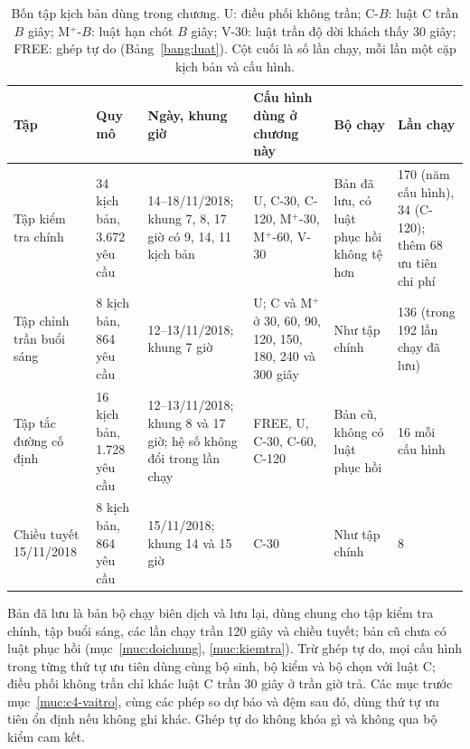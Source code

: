 \begin{table}[htbp]
\centering
\caption[Các tập kịch bản dùng trong thực nghiệm]{Bốn tập kịch bản dùng trong chương. U: điều phối không trần; C-$B$: luật C trần $B$ giây;
M$^{+}$-$B$: luật hạn chót $B$ giây; V-30: luật trần độ dời khách thấy 30 giây; FREE: ghép tự do
(Bảng~\ref{bang:luat}). Cột cuối là số lần chạy, mỗi lần một cặp kịch bản và cấu hình.}
\label{bang:c4-taptu}
\footnotesize
\setlength{\tabcolsep}{2.5pt}
\begin{tabular}{@{}p{2.5cm}p{1.9cm}p{3.1cm}p{3.0cm}p{2.6cm}p{1.9cm}@{}}
\toprule
\textbf{Tập} & \textbf{Quy mô} & \textbf{Ngày, khung giờ} & \textbf{Cấu hình dùng ở chương này} &
\textbf{Bộ chạy} & \textbf{Lần chạy}\\
\midrule
Tập kiểm tra chính & 34 kịch bản, 3.672 yêu cầu & 14--18/11/2018; khung 7, 8, 17 giờ có 9, 14, 11
kịch bản & U, C-30, C-120, M$^{+}$-30, M$^{+}$-60, V-30 & Bản đã lưu, có luật phục hồi không tệ hơn &
170 (năm cấu hình), 34 (C-120); thêm 68 ưu tiên chi phí\\
Tập chỉnh trần buổi sáng & 8 kịch bản, 864 yêu cầu & 12--13/11/2018; khung 7 giờ & U; C và M$^{+}$ ở 30, 60,
90, 120, 150, 180, 240 và 300 giây & Như tập chính & 136 (trong 192 lần chạy đã lưu)\\
Tập tắc đường cố định & 16 kịch bản, 1.728 yêu cầu & 12--13/11/2018; khung 8 và 17 giờ; hệ số không
đổi trong lần chạy & FREE, U, C-30, C-60, C-120 & Bản cũ, không có luật phục hồi & 16 mỗi cấu hình\\
Chiều tuyết 15/11/2018 & 8 kịch bản, 864 yêu cầu & 15/11/2018; khung 14 và 15 giờ & C-30 &
Như tập chính & 8\\
\bottomrule
\end{tabular}
\end{table}

Bản đã lưu là bản bộ chạy biên dịch và lưu lại, dùng chung cho tập kiểm tra chính, tập buổi sáng, các lần chạy trần
120 giây và chiều tuyết; bản cũ chưa có luật phục hồi (mục~\ref{muc:doichung}, \ref{muc:kiemtra}). Trừ ghép tự do, mọi
cấu hình trong từng thứ tự ưu tiên dùng cùng bộ sinh, bộ kiểm và bộ chọn với luật C; điều phối không trần chỉ
khác luật C trần 30 giây ở trần giờ trả. Các mục trước mục~\ref{muc:c4-vaitro}, cùng các phép so dự báo và đệm
sau đó, dùng thứ tự ưu tiên ổn định nếu không ghi khác. Ghép tự do không khóa gì và không qua bộ kiểm cam kết.

